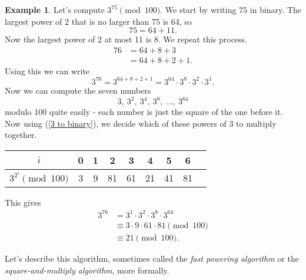 \documentclass[12pt]{article}
\theoremstyle{plain}
\theoremstyle{definition}
\newtheorem{example}[theorem]{Example}
\theoremstyle{remark}
\begin{document}
\begin{example}
    Let's compute $3^{75}\pmod {100}$.
    We start by writing $75$ in binary.
    The largest power of 2 that is no larger than 75 is 64, so
    \[
        75 = 64 + 11.
    \]
    Now the largest power of 2 at most 11 is 8. We repeat this process.
    \begin{align*}
        76 &= 64 + 8 + 3\\
        &= 64 + 8 + 2 + 1.
    \end{align*}
    Using this we can write
    \begin{equation}\label{3 to binary}
        3^{76} = 3^{64 + 8 + 2 + 1} = 3^{64}\cdot 3^8\cdot 3^2\cdot 3^1.
    \end{equation}
    Now we can compute the seven numbers
    \[
        3,\ 3^2,\ 3^4,\ 3^8,\ \ldots,\ 3^{64}
    \]
    modulo 100 quite easily - each number is just the square of the one before it.
    Now using (\ref{3 to binary}), we decide which of these powers of 3 to multiply together.
    \begin{center}
    \begin{tabular}{|c|| c | c | c | c | c | c | c | c|}
        \hline
        $i$ & 0 & 1 & 2 & 3 & 4 & 5 & 6\\
        \hline
        $3^{2^i}\pmod{100}$ & 3 & 9 &  81 & 61 & 21 & 41 & 81\\
        \hline
    \end{tabular}
    \end{center}
    This gives
    \begin{align*}
         3^{76} &= 3^1\cdot 3^2\cdot 3^8\cdot 3^{64}\\
         &\equiv 3\cdot 9\cdot 61\cdot 81 \pmod{100}\\
         &\equiv 21 \pmod{100}.
    \end{align*}
\end{example}


Let's describe this algorithm, sometimes called the \emph{fast powering algorithm} or the \emph{square-and-multiply algorithm}, more formally.
\end{document}

